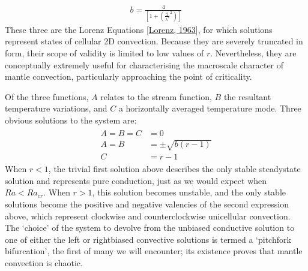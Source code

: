 \documentclass[letterpaper,10pt,english]{jupyterBook}
\begin{document}
\begin{equation*}
\begin{split} b = \frac{4}{\left[ 1 + \left( \frac{2}{\lambda^*}^2 \right) \right]} \end{split}
\end{equation*}
\sphinxAtStartPar
These three are the Lorenz Equations {[}\hyperlink{cite.references:id676}{Lorenz, 1963}{]}, for which solutions represent states of cellular 2D convection. Because they are severely truncated in form, their scope of validity is limited to low values of \(r\). Nevertheless, they are conceptually extremely useful for characterising the macro\sphinxhyphen{}scale character of mantle convection, particularly approaching the point of criticality.

\sphinxAtStartPar
Of the three functions, \(A\) relates to the stream function, \(B\) the resultant temperature variations, and \(C\) a horizontally averaged temperature mode. Three obvious solutions to the system are:
\begin{equation*}
\begin{split} \begin{align*}
A = B = C &= 0 \\
A = B &= \pm \sqrt{b \left( r - 1 \right)} \\
C &= r - 1
\end{align*} \end{split}
\end{equation*}
\sphinxAtStartPar
When \(r<1\), the trivial first solution above describes the only stable steady\sphinxhyphen{}state solution and represents pure conduction, just as we would expect when \(Ra<Ra_{cr}\). When \(r>1\), this solution becomes unstable, and the only stable solutions become the positive and negative valencies of the second expression above, which represent clockwise and counterclockwise unicellular convection. The ‘choice’ of the system to devolve from the unbiased conductive solution to one of either the left\sphinxhyphen{} or right\sphinxhyphen{}biased convective solutions is termed a ‘pitchfork bifurcation’, the first of many we will encounter; its existence proves that mantle convection is chaotic.
\end{document}
